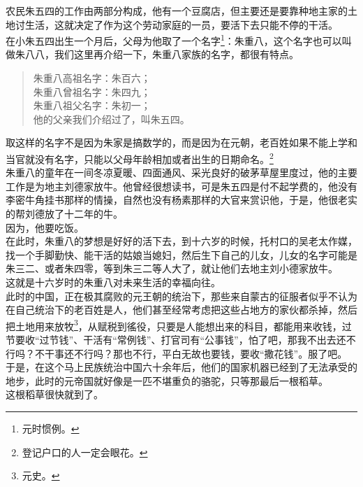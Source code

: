 \begin{multicols}{\theparacolNo}
农民朱五四的工作由两部分构成，他有一个豆腐店，但主要还是要靠种地主家的土地讨生活，这就决定了作为这个劳动家庭的一员，要活下去只能不停的干活。\\

在小朱五四出生一个月后，父母为他取了一个名字\footnote{元时惯例。}：朱重八，这个名字也可以叫做朱八八，我们这里再介绍一下，朱重八家族的名字，都很有特点。
{\footnotesize \begin{quote}
	朱重八高祖名字：朱百六；\\
	朱重八曾祖名字：朱四九；\\
	朱重八祖父名字：朱初一；\\
	他的父亲我们介绍过了，叫朱五四。\\
\end{quote}}

取这样的名字不是因为朱家是搞数学的，而是因为在元朝，老百姓如果不能上学和当官就没有名字，只能以父母年龄相加或者出生的日期命名。\footnote{登记户口的人一定会眼花。}\\

朱重八的童年在一间冬凉夏暖、四面通风、采光良好的破茅草屋里度过，他的主要工作是为地主刘德家放牛。他曾经很想读书，可是朱五四是付不起学费的，他没有李密牛角挂书那样的情操，自然也没有杨素那样的大官来赏识他，于是，他很老实的帮刘德放了十二年的牛。\\

因为，他要吃饭。\\

在此时，朱重八的梦想是好好的活下去，到十六岁的时候，托村口的吴老太作媒，找一个手脚勤快、能干活的姑娘当媳妇，然后生下自己的儿女，儿女的名字可能是朱三二、或者朱四零，等到朱三二等人大了，就让他们去地主刘小德家放牛。\\

这就是十六岁时的朱重八对未来生活的幸福向往。\\

此时的中国，正在极其腐败的元王朝的统治下，那些来自蒙古的征服者似乎不认为在自己统治下的老百姓是人，他们甚至经常考虑把这些占地方的家伙都杀掉，然后把土地用来放牧\footnote{元史。}，从赋税到徭役，只要是人能想出来的科目，都能用来收钱，过节要收“过节钱”、干活有“常例钱”、打官司有“公事钱”，怕了吧，那我不出去还不行吗？不干事还不行吗？那也不行，平白无故也要钱，要收“撒花钱”。服了吧。\\

于是，在这个马上民族统治中国六十余年后，他们的国家机器已经到了无法承受的地步，此时的元帝国就好像是一匹不堪重负的骆驼，只等那最后一根稻草。\\

这根稻草很快就到了。\\


\end{multicols}
